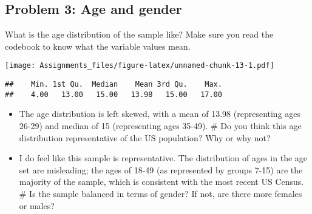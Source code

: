 \documentclass[
]{article}
\newenvironment{Shaded}{\begin{snugshade}}{\end{snugshade}}
\newcommand{\FunctionTok}[1]{\textcolor[rgb]{0.00,0.00,0.00}{#1}}
\newcommand{\NormalTok}[1]{#1}
\newcommand{\SpecialCharTok}[1]{\textcolor[rgb]{0.00,0.00,0.00}{#1}}
\providecommand{\tightlist}{%
  \setlength{\itemsep}{0pt}\setlength{\parskip}{0pt}}
\begin{document}
\hypertarget{problem-3-age-and-gender}{%
\subsection{Problem 3: Age and gender}\label{problem-3-age-and-gender}}

What is the age distribution of the sample like? Make sure you read the
codebook to know what the variable values mean.

\begin{Shaded}
\end{Shaded}

\texttt{[image: Assignments\_files/figure-latex/unnamed-chunk-13-1.pdf]}

\begin{Shaded}
\end{Shaded}

\begin{verbatim}
##    Min. 1st Qu.  Median    Mean 3rd Qu.    Max. 
##    4.00   13.00   15.00   13.98   15.00   17.00
\end{verbatim}

\begin{itemize}
\tightlist
\item
  The age distribution is left skewed, with a mean of 13.98
  (representing ages 26-29) and median of 15 (representing ages 35-49).
  \# Do you think this age distribution representative of the US
  population? Why or why not?
\item
  I do feel like this sample is representative. The distribution of ages
  in the age set are misleading; the ages of 18-49 (as represented by
  groups 7-15) are the majority of the sample, which is consistent with
  the most recent US Census. \# Is the sample balanced in terms of
  gender? If not, are there more females or males?
\end{itemize}

\begin{Shaded}
\end{Shaded}
\end{document}
